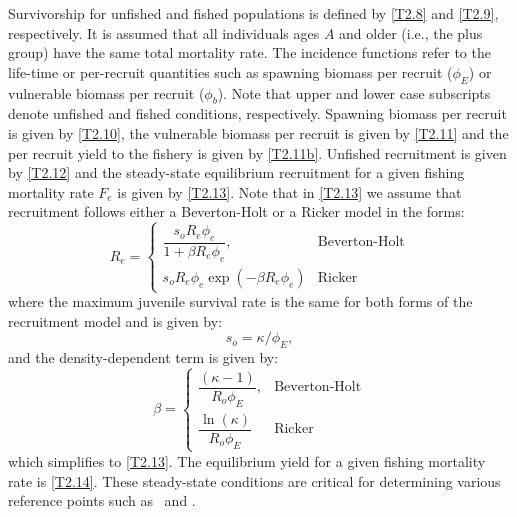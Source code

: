 \begin{multicols}{2}
Survivorship for unfished and fished populations is defined by \eqref{T2.8} and \eqref{T2.9}, respectively.  It is assumed that all individuals ages $A$ and older (i.e., the plus group) have the same total mortality rate.  The incidence functions refer to the life-time or per-recruit quantities such as spawning biomass per recruit ($\phi_E$) or vulnerable biomass per recruit ($\phi_b$).  Note that upper and lower case subscripts denote unfished and fished conditions, respectively.  Spawning biomass per recruit is given by \eqref{T2.10}, the vulnerable biomass per recruit is given by \eqref{T2.11} and the per recruit yield to the fishery is given by \eqref{T2.11b}.  Unfished recruitment is given by \eqref{T2.12} and the steady-state equilibrium recruitment  for a given fishing mortality rate $F_e$ is given by \eqref{T2.13}.  Note that in \eqref{T2.13} we assume that recruitment follows either a  Beverton-Holt or a Ricker model in the forms:
\[
R_e=\begin{cases}
    \dfrac{s_o R_e \phi_e}{1+\beta R_e \phi_e},& \mbox{Beverton-Holt}\\[5ex]
    s_o R_e \phi_e \exp(-\beta R_e \phi_e)& \mbox{Ricker}
\end{cases}
\]
where the maximum juvenile survival rate is the same for both forms of the recruitment model and is given by:
\[
s_o = \kappa/\phi_E,
\]
and the density-dependent term is given by:
\[
\beta =\begin{cases}
    \dfrac{(\kappa-1)}{R_o\phi_E}, & \mbox{Beverton-Holt}\\[5ex]
    {\dfrac {\ln  \left( \kappa \right) }{R_{{o}}\phi_{{E}}}} & \mbox{Ricker}
\end{cases} 
\]
which simplifies to \eqref{T2.13}.
 The equilibrium yield for a given fishing mortality rate is \eqref{T2.14}.  These steady-state conditions are critical for determining various reference points such as \fmsy\ and \bmsy.  




\end{multicols}
